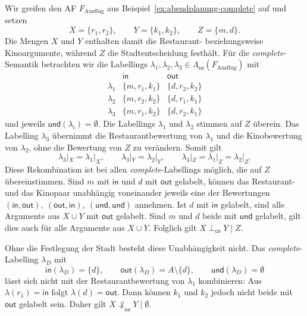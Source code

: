 \begin{Example}
    \label{ex:abendplanung-independence}
    Wir greifen den AF \(F_{\mathrm{Ausflug}}\) aus
    Beispiel~\ref{ex:abendplanung-complete} auf und setzen
    \[
        X=\{r_1,r_2\},\qquad
        Y=\{k_1,k_2\},\qquad
        Z=\{m,d\}.
    \]
    Die Mengen \(X\) und \(Y\) enthalten damit die Restaurant- beziehungsweise
    Kinoargumente, während \(Z\) die Stadtentscheidung festhält.
    Für die \emph{complete}-Semantik betrachten wir die Labellings
    \(\lambda_1,\lambda_2,\lambda_3\in
    \Lambda_{\mathsf{co}}(F_{\mathrm{Ausflug}})\) mit
    \[
    \begin{array}{c|c|c}
        & \mathsf{in} & \mathsf{out}\\
        \hline
        \lambda_1 & \{m,r_1,k_1\} & \{d,r_2,k_2\}\\
        \lambda_2 & \{m,r_2,k_2\} & \{d,r_1,k_1\}\\
        \lambda_3 & \{m,r_1,k_2\} & \{d,r_2,k_1\}
    \end{array}
    \]
    und jeweils
    \(\mathsf{und}(\lambda_i)=\emptyset\).
    Die Labellings \(\lambda_1\) und \(\lambda_2\) stimmen auf \(Z\)
    überein. Das Labelling \(\lambda_3\) übernimmt die Restaurantbewertung
    von \(\lambda_1\) und die Kinobewertung von \(\lambda_2\), ohne die
    Bewertung von \(Z\) zu verändern. Somit gilt
    \[
        \lambda_3|_X=\lambda_1|_X,\qquad
        \lambda_3|_Y=\lambda_2|_Y,\qquad
        \lambda_3|_Z=\lambda_1|_Z=\lambda_2|_Z.
    \]
    Diese Rekombination ist bei allen \emph{complete}-Labellings möglich,
    die auf \(Z\) übereinstimmen. Sind \(m\) mit
    \(\mathsf{in}\) und \(d\) mit \(\mathsf{out}\) gelabelt, können das
    Restaurant- und das Kinopaar unabhängig voneinander jeweils eine
    der Bewertungen
    \(
        (\mathsf{in},\mathsf{out}),~
        (\mathsf{out},\mathsf{in}),~
        (\mathsf{und},\mathsf{und})
    \)
    annehmen. Ist \(d\) mit \(\mathsf{in}\) gelabelt, sind alle Argumente
    aus \(X\cup Y\) mit \(\mathsf{out}\) gelabelt. Sind \(m\) und \(d\)
    beide mit \(\mathsf{und}\) gelabelt, gilt dies auch für alle Argumente
    aus \(X\cup Y\). Folglich gilt
    \(
        X\perp_{\mathsf{co}}Y\mid Z.
    \)

    Ohne die Festlegung der Stadt besteht diese Unabhängigkeit nicht.
    Das \emph{complete}-Labelling \(\lambda_D\) mit
    \[
        \mathsf{in}(\lambda_D)=\{d\},\qquad
        \mathsf{out}(\lambda_D)=A\setminus\{d\},\qquad
        \mathsf{und}(\lambda_D)=\emptyset
    \]
    lässt sich nicht mit der Restaurantbewertung von \(\lambda_1\)
    kombinieren: Aus \(\lambda(r_1)=\mathsf{in}\) folgt
    \(\lambda(d)=\mathsf{out}\). Dann können \(k_1\) und \(k_2\) jedoch
    nicht beide mit \(\mathsf{out}\) gelabelt sein. Daher gilt
    \(
        X\not\perp_{\mathsf{co}}Y\mid\emptyset.
    \)
\end{Example}

